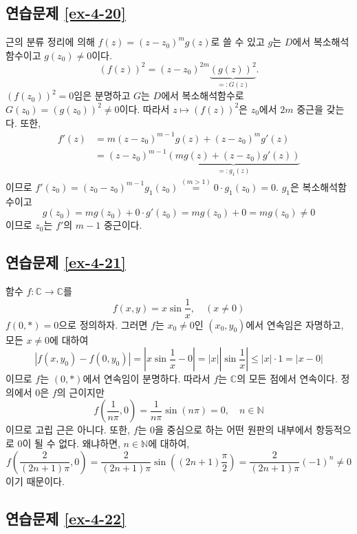 \subsection*{연습문제 \ref{ex-4-20}}

근의 분류 정리에 의해 $f(z)=(z-z_0)^m g(z)$로 쓸 수 있고
$g$는 $D$에서 복소해석함수이고 $g(z_0)\ne0$이다.
\[
\left( f(z) \right)^2 = (z-z_0)^{2m} 
\underbrace{ \left( g(z) \right)^2}_{=:G(z)}.
\]
$(f(z_0))^2=0$임은 분명하고 $G$는 $D$에서 복소해석함수로 
$G(z_0) = (g(z_0))^2 \ne 0$이다.
따라서 $z\mapsto (f(z))^2$은 $z_0$에서 $2m$ 중근을 갖는다.
또한,
\begin{align*}
f'(z) &= m(z-z_0)^{m-1} g(z) + (z-z_0)^m g'(z) \\
&= (z-z_0)^{m-1} \underbrace{(mg(z) + (z-z_0)g'(z))}_{=:g_1(z)}
\end{align*}
이므로 $f'(z_0) = (z_0 - z_0)^{m-1}g_1(z_0) \stackrel{(m>1)}{=}
0\cdot g_1(z_0) = 0$.
$g_1$은 복소해석함수이고 
\[
g(z_0) = mg(z_0) + 0\cdot g'(z_0) = mg(z_0) + 0 = mg(z_0) \ne 0
\]
이므로 $z_0$는 $f'$의 $m-1$ 중근이다.

\subsection*{연습문제 \ref{ex-4-21}}

함수 $f:\mathbb C \to \mathbb C$를
\[
f(x,y) = x\sin \dfrac1x, \quad (x\ne0)
\]
$f(0,*)=0$으로 정의하자.
그러면 $f$는 $x_0\ne0$인 $(x_0, y_0)$에서 연속임은 자명하고,
모든 $x\ne0$에 대하여
\[
|f(x,y_0) - f(0,y_0)|= \left| x\sin \dfrac1x - 0\right| = |x| \left| \sin \dfrac 1x \right|
\le |x| \cdot 1 = |x-0|
\]
이므로 $f$는 $(0,*)$에서 연속임이 분명하다.
따라서 $f$는 $\mathbb C$의 모든 점에서 연속이다.
정의에서 $0$은 $f$의 근이지만 
\[
f\left( \dfrac1{n\pi}, 0\right) = \dfrac1{n\pi} \sin(n\pi) = 0, \quad n\in\mathbb N
\]
이므로 고립 근은 아니다.
또한, $f$는 $0$을 중심으로 하는 어떤 원판의 내부에서 항등적으로 $0$이 될 수 없다.
왜냐하면, $n\in\mathbb N$에 대하여,
\[
f\left( \dfrac2{(2n+1)\pi}, 0\right) 
= \dfrac2{(2n+1)\pi}\sin\left((2n+1)\dfrac\pi2 \right) 
=\dfrac2{(2n+1)\pi}(-1)^n \ne0
\]
이기 때문이다.

\subsection*{연습문제 \ref{ex-4-22}}

